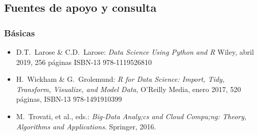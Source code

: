 \subsection{Fuentes de apoyo y consulta}

\subsubsection{B\'{a}sicas}

\begin{itemize}[itemsep=0em]
  
\item{D.T.\ {\sc Larose} \& C.D.\ {\sc Larose}: {\em Data Science Using Python and R}
    Wiley, abril 2019, 256 p\'{a}ginas ISBN-13 978-1119526810}
  
\item{H.\ {\sc Wickham} \& G.\ {\sc  Grolemund}:
    {\em R for Data Science: Import, Tidy, Transform, Visualize, and Model Data},
    O'Reilly Media, enero 2017, 
    520 p\'{a}ginas, ISBN-13 978-1491910399}
  
\item{M.\ {\sc Trovati}, et al., eds.: {\em Big-Data Analy;cs and
      Cloud Compu;ng: Theory, Algorithms and Applications}. Springer,
    2016.}
\end{itemize}



\label{final} %


